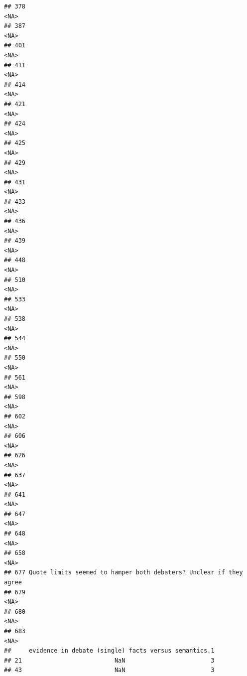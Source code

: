 \documentclass[
]{article}
\begin{document}
\begin{verbatim}
## 378                                                               <NA>
## 387                                                               <NA>
## 401                                                               <NA>
## 411                                                               <NA>
## 414                                                               <NA>
## 421                                                               <NA>
## 424                                                               <NA>
## 425                                                               <NA>
## 429                                                               <NA>
## 431                                                               <NA>
## 433                                                               <NA>
## 436                                                               <NA>
## 439                                                               <NA>
## 448                                                               <NA>
## 510                                                               <NA>
## 533                                                               <NA>
## 538                                                               <NA>
## 544                                                               <NA>
## 550                                                               <NA>
## 561                                                               <NA>
## 598                                                               <NA>
## 602                                                               <NA>
## 606                                                               <NA>
## 626                                                               <NA>
## 637                                                               <NA>
## 641                                                               <NA>
## 647                                                               <NA>
## 648                                                               <NA>
## 658                                                               <NA>
## 677 Quote limits seemed to hamper both debaters? Unclear if they agree
## 679                                                               <NA>
## 680                                                               <NA>
## 683                                                               <NA>
##     evidence in debate (single) facts versus semantics.1
## 21                          NaN                        3
## 43                          NaN                        3

\end{verbatim}
\end{document}
